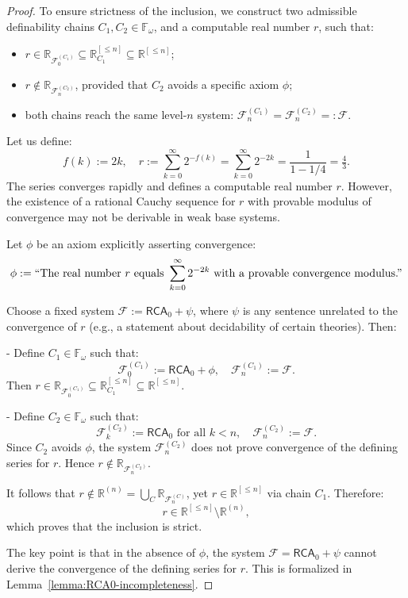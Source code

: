 \documentclass[12pt]{article}
\theoremstyle{definition}
\theoremstyle{plain}
\theoremstyle{remark}
\begin{document}
\begin{proof}
To ensure strictness of the inclusion, we construct two admissible definability chains \( C_1, C_2 \in \mathbb{F}_\omega \), and a computable real number \( r \), such that:
\begin{itemize}
    \item \( r \in \mathbb{R}_{\mathcal{F}_0^{(C_1)}} \subseteq \mathbb{R}_{C_1}^{[\leq n]} \subseteq \mathbb{R}^{[\leq n]} \);
    \item \( r \notin \mathbb{R}_{\mathcal{F}_n^{(C_2)}} \), provided that \( C_2 \) avoids a specific axiom \( \phi \);
    \item both chains reach the same level-\( n \) system: \( \mathcal{F}_n^{(C_1)} = \mathcal{F}_n^{(C_2)} =: \mathcal{F} \).
\end{itemize}

Let us define:
\[
    f(k) := 2k, \quad r := \sum_{k=0}^{\infty} 2^{-f(k)} = \sum_{k=0}^{\infty} 2^{-2k} = \frac{1}{1 - 1/4} = \tfrac{4}{3}.
\]
The series converges rapidly and defines a computable real number \( r \). However, the existence of a rational Cauchy sequence for \( r \) with provable modulus of convergence may not be derivable in weak base systems.

Let \( \phi \) be an axiom explicitly asserting convergence:
\[
    \phi := \text{``The real number \( r \) equals } \sum_{k=0}^\infty 2^{-2k} \text{ with a provable convergence modulus.''}
\]

Choose a fixed system \( \mathcal{F} := \mathsf{RCA}_0 + \psi \), where \( \psi \) is any sentence unrelated to the convergence of \( r \) (e.g., a statement about decidability of certain theories). Then:

- Define \( C_1 \in \mathbb{F}_\omega \) such that:
  \[
      \mathcal{F}_0^{(C_1)} := \mathsf{RCA}_0 + \phi, \quad \mathcal{F}_n^{(C_1)} := \mathcal{F}.
  \]
  Then \( r \in \mathbb{R}_{\mathcal{F}_0^{(C_1)}} \subseteq \mathbb{R}_{C_1}^{[\leq n]} \subseteq \mathbb{R}^{[\leq n]} \).

- Define \( C_2 \in \mathbb{F}_\omega \) such that:
  \[
      \mathcal{F}_k^{(C_2)} := \mathsf{RCA}_0 \text{ for all } k < n, \quad \mathcal{F}_n^{(C_2)} := \mathcal{F}.
  \]
  Since \( C_2 \) avoids \( \phi \), the system \( \mathcal{F}_n^{(C_2)} \) does not prove convergence of the defining series for \( r \). Hence \( r \notin \mathbb{R}_{\mathcal{F}_n^{(C_2)}} \).

It follows that \( r \notin \mathbb{R}^{(n)} = \bigcup_{C} \mathbb{R}_{\mathcal{F}_n^{(C)}} \), yet \( r \in \mathbb{R}^{[\leq n]} \) via chain \( C_1 \). Therefore:
\[
    r \in \mathbb{R}^{[\leq n]} \setminus \mathbb{R}^{(n)},
\]
which proves that the inclusion is strict.

The key point is that in the absence of \( \phi \), the system \( \mathcal{F} = \mathsf{RCA}_0 + \psi \) cannot derive the convergence of the defining series for \( r \). This is formalized in Lemma~\ref{lemma:RCA0-incompleteness}.
\end{proof}
\end{document}
